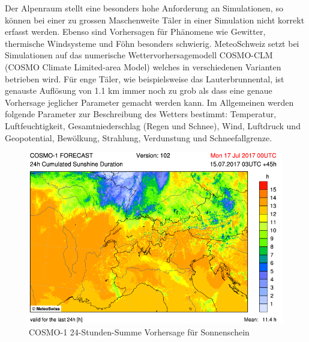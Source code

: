 \begin{refsection}
Der Alpenraum stellt eine besonders hohe Anforderung an Simulationen, so können bei einer zu grossen Maschenweite Täler in einer Simulation nicht korrekt erfasst werden. Ebenso sind Vorhersagen  für Phänomene wie Gewitter, thermische Windsysteme und Föhn besonders schwierig. MeteoSchweiz setzt bei Simulationen auf das numerische Wettervorhersagemodell COSMO-CLM (COSMO Climate Limited-area Model) welches in verschiedenen Varianten betrieben wird. Für enge Täler, wie beispielsweise das Lauterbrunnental, ist genauste Auflösung von 1.1 km immer noch zu grob als dass eine genaue Vorhersage jeglicher Parameter gemacht werden kann.
Im Allgemeinen werden folgende Parameter zur Beschreibung des Wetters bestimmt: Temperatur, Luftfeuchtigkeit, Gesamtniederschlag (Regen und Schnee), Wind, Luftdruck und Geopotential, Bewölkung, Strahlung, Verdunstung und Schneefallgrenze.

\begin{figure}
\centering
\includegraphics[width=\hsize]{klima/cosmo1.png}
\caption{COSMO-1 24-Stunden-Summe Vorhersage für Sonnenschein \cite{klima:meteoschweiz}
\label{klima:wettervorhersagen:cosmo}}
\end{figure}


\end{refsection}
